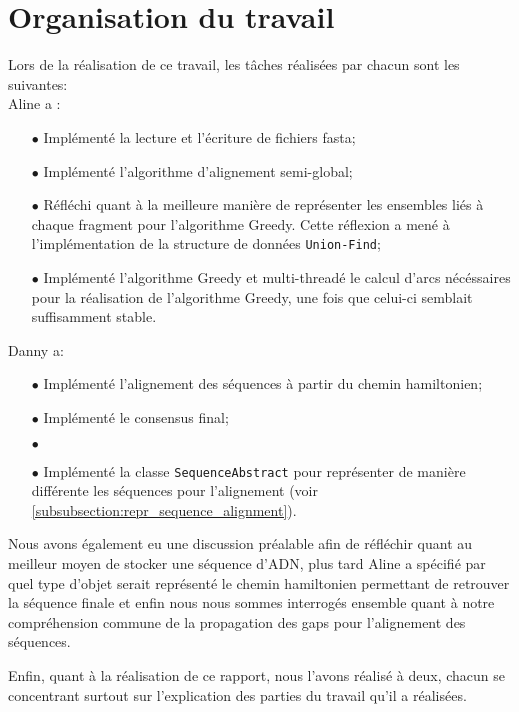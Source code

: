 \section{Organisation du travail}

Lors de la réalisation de ce travail, les tâches réalisées par chacun sont les suivantes:\\
Aline a :
\begin{itemize}
	\item[$\bullet$]Implémenté la lecture et l'écriture de fichiers fasta;
	\item[$\bullet$]Implémenté l'algorithme d'alignement semi-global;
	\item[$\bullet$]Réfléchi quant à la meilleure manière de représenter les ensembles liés à chaque fragment pour l'algorithme Greedy.
	 Cette réflexion a mené à l'implémentation de la structure de données \verb|Union-Find|;
	\item[$\bullet$]Implémenté l'algorithme Greedy et multi-threadé le calcul d'arcs nécéssaires pour la réalisation de l'algorithme Greedy, une fois que celui-ci semblait suffisamment stable.
\end{itemize}
$ $\\
Danny a:
\begin{itemize}
	\item[$\bullet$] Implémenté l'alignement des séquences à partir du chemin hamiltonien;
	\item[$\bullet$] Implémenté le consensus final;
	\item[$\bullet$] %
	\item[$\bullet$] Implémenté la classe \verb|SequenceAbstract| pour
		représenter de manière différente les séquences pour l'alignement
		(voir \ref{subsubsection:repr_sequence_alignment}).
\end{itemize}

Nous avons également eu une discussion préalable afin de réfléchir quant au meilleur moyen de stocker une séquence d'ADN, plus tard Aline a spécifié par quel type d'objet serait représenté le chemin hamiltonien permettant de retrouver la séquence finale et enfin nous nous sommes interrogés ensemble quant à notre compréhension commune de la propagation des gaps pour l'alignement des séquences.
\begin{comment}
De plus, Aline ayant également réfléchi à la manière d'obtenir la séquence finale à partir du chemin hamiltonien donné par l'algorithme greedy avant que Danny ne propose sa propre solution, elle a également exposé son point de vue quant à la réalisation de cette dernière étape. Le temps lui ayant manqué, son algorithme n'est pas totalement abouti et nous avons donc continué de travailler à partir de celui de Danny.
\end{comment}

Enfin, quant à la réalisation de ce rapport, nous l'avons réalisé à deux, chacun se concentrant surtout sur l'explication des parties du travail qu'il a réalisées.
